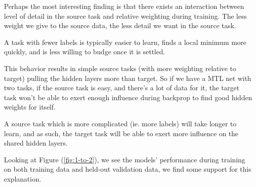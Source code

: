 \documentclass[a4paper]{article}
\begin{document}
Perhaps the most interesting finding is that there exists an interaction between level of detail in the source task and relative weighting during training. The less weight we give to the source data, the less detail we want in the source task.

A task with fewer labels is typically easier to learn, finds a local minimum more quickly, and is less willing to budge once it is settled.

This behavior results in simple source tasks (with more weighting relative to target) pulling the hidden layers more than target. So if we have a MTL net with two tasks, if the source task is easy, and there's a lot of data for it, the target task won't be able to exert enough influence during backprop to find good hidden weights for itself.

A source task which is more complicated (ie. more labels) will take longer to learn, and as such, the target task will be able to exert more influence on the shared hidden layers.


Looking at Figure (\ref{fig:1-to-2}), we see the models' performance during training on both training data and held-out validation data, we find some support for this explanation.
\end{document}
